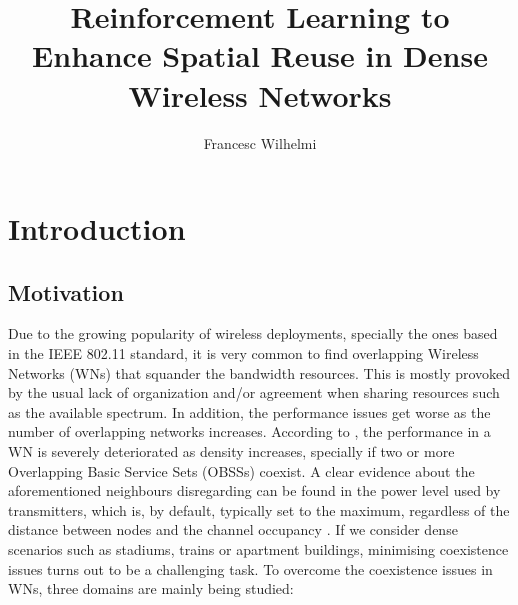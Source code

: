 \documentclass[12pt, a4paper,twoside]{tesi_upf}
\title{Reinforcement Learning to Enhance Spatial Reuse in Dense Wireless Networks}
\author{Francesc Wilhelmi}
\begin{document}
	\frontmatter
	
	\maketitle
	
	\cleardoublepage
	
	
	\mainmatter
	
	\tableofcontents
	
	\chapter{Introduction}
	\label{section:introduction}	
	
		\section{Motivation}
		\label{section:motivation}
			Due to the growing popularity of wireless deployments, specially the ones based in the IEEE 802.11 standard, it is very common to find overlapping Wireless Networks (WNs) that squander the bandwidth resources. This is mostly provoked by the usual lack of organization and/or agreement when sharing resources such as the available spectrum. In addition, the performance issues get worse as the number of overlapping networks increases. According to \cite{zhong2015issues}, the performance in a WN is severely deteriorated as density increases, specially if two or more Overlapping Basic Service Sets (OBSSs) coexist. A clear evidence about the aforementioned neighbours disregarding can be found in the power level used by transmitters, which is, by default, typically set to the maximum, regardless of the distance between nodes and the channel occupancy \cite{akella2007self}. If we consider dense scenarios such as stadiums, trains or apartment buildings, minimising coexistence issues turns out to be a challenging task. To overcome the coexistence issues in WNs, three domains are mainly being studied:
			
\end{document}
